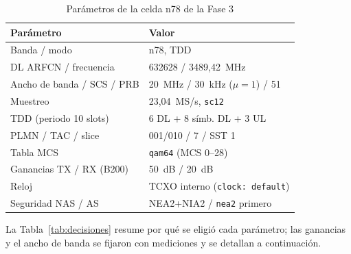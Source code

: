 \documentclass[conference]{IEEEtran}
\begin{document}
\begin{table}[!t]
\caption{Parámetros de la celda n78 de la Fase 3}
\label{tab:celda}
\centering
\footnotesize
\begin{tabular}{ll}
\toprule
\textbf{Parámetro} & \textbf{Valor} \\
\midrule
Banda / modo & n78, TDD \\
DL ARFCN / frecuencia & 632628 / 3489{,}42~MHz \\
Ancho de banda / SCS / PRB & 20~MHz / 30~kHz ($\mu=1$) / 51 \\
Muestreo & 23{,}04~MS/s, \texttt{sc12} \\
TDD (periodo 10 slots) & 6 DL + 8 símb. DL + 3 UL \\
PLMN / TAC / slice & 001/010 / 7 / SST 1 \\
Tabla MCS & \texttt{qam64} (MCS 0--28) \\
Ganancias TX / RX (B200) & 50~dB / 20~dB \\
Reloj & TCXO interno (\texttt{clock: default}) \\
Seguridad NAS / AS & NEA2+NIA2 / \texttt{nea2} primero \\
\bottomrule
\end{tabular}
\end{table}

La Tabla~\ref{tab:decisiones} resume por qué se eligió cada parámetro; las ganancias y el ancho de banda se fijaron con mediciones y se detallan a continuación.
\end{document}
